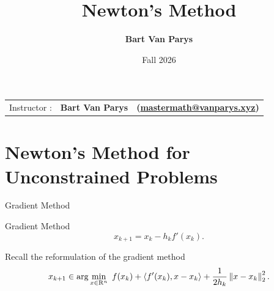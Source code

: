 \documentclass[9pt]{beamer}
\title[Continuous Optimization]{Newton's Method}
\author[]{\textbf{Bart Van Parys}}
\date[]{Fall 2026}
\begin{document}
\begin{frame}  

  \maketitle

  \vspace{-2em}
  
    \begin{center}
    \begin{tabular}{lll}
      Instructor : & \textbf{Bart Van Parys} & \textbf{(\href{mailto:mastermath@vanparys.xyz}{mastermath@vanparys.xyz})} \\
    \end{tabular}
  \end{center}
  
\end{frame}

\section{Newton's Method for Unconstrained Problems}

\begin{frame}{Gradient Method}

  Gradient Method
  \[
    x_{k+1} = x_k - h_k f'(x_k).
  \]

  \vfill
  
  Recall the reformulation of the gradient method
  \[
    x_{k+1 } \in \arg \min_{x\in\mathrm{R}^n} ~f(x_k) + \left<f'(x_k), x-x_k\right> + \frac{1}{2 h_k} \left\|x - x_k\right\|^2_2. 
  \]

\end{frame}
\end{document}
